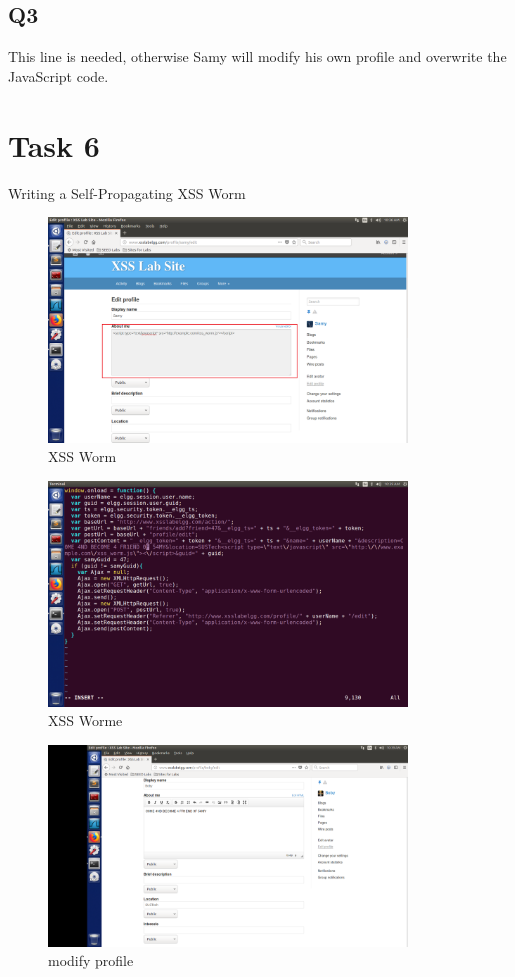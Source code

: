 \documentclass[onecolumn,oneside]{SUSTechHomework}
\begin{document}
    \subsection*{Q3}

      This line is needed, otherwise Samy will modify his own profile and overwrite the JavaScript code.

  \section*{Task 6}
  Writing a Self-Propagating XSS Worm

  \begin{figure}[H]
    \centering
    \includegraphics[width=0.85\textwidth]{img/task6_1.png}
    \caption{XSS Worm} 
  \end{figure}

  \begin{figure}[H]
    \centering
    \includegraphics[width=0.85\textwidth]{img/task6_2.png}
    \caption{XSS Worme}
  \end{figure}

  \begin{figure}[H]
    \centering
    \includegraphics[width=0.85\textwidth]{img/task6_3.png}
    \caption{modify profile}
  \end{figure}
\end{document}
